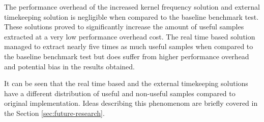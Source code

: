 \documentclass[..thesis.tex]{subfiles}
\begin{document}
The performance overhead of the increased kernel frequency solution and external timekeeping solution is negligible when compared to the baseline benchmark test. These solutions proved to significantly increase the amount of useful samples extracted at a very low performance overhead cost. The real time based solution managed to extract nearly five times as much useful samples when compared to the baseline benchmark test but does suffer from higher performance overhead and potential bias in the results obtained. 

It can be seen that the real time based and the external timekeeping solutions have a different distribution of useful and non-useful samples compared to original implementation. Ideas describing this phenomenom are briefly covered in the Section \ref{sec:future-research}.
\end{document}
